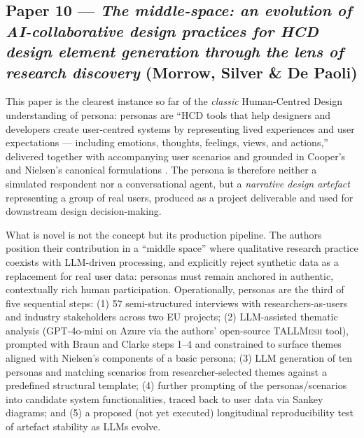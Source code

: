 
\subsection*{Paper 10 --- \emph{The middle-space: an evolution of AI-collaborative design practices for HCD design element generation through the lens of research discovery} (Morrow, Silver \& De Paoli)}

This paper is the clearest instance so far of the \emph{classic} Human-Centred Design understanding of persona: personas are ``HCD tools that help designers and developers create user-centred systems by representing lived experiences and user expectations --- including emotions, thoughts, feelings, views, and actions,'' delivered together with accompanying user scenarios and grounded in Cooper's and Nielsen's canonical formulations \cite{cooper1999, nielsen1990}. The persona is therefore neither a simulated respondent nor a conversational agent, but a \emph{narrative design artefact} representing a group of real users, produced as a project deliverable and used for downstream design decision-making.

What is novel is not the concept but its production pipeline. The authors position their contribution in a ``middle space'' where qualitative research practice coexists with LLM-driven processing, and explicitly reject synthetic data as a replacement for real user data: personas must remain anchored in authentic, contextually rich human participation. Operationally, personas are the third of five sequential steps: (1) 57 semi-structured interviews with researchers-as-users and industry stakeholders across two EU projects; (2) LLM-assisted thematic analysis (GPT-4o-mini on Azure via the authors' open-source \textsc{TALLMesh} tool), prompted with Braun and Clarke steps 1--4 and constrained to surface themes aligned with Nielsen's components of a basic persona; (3) LLM generation of ten personas and matching scenarios from researcher-selected themes against a predefined structural template; (4) further prompting of the personas/scenarios into candidate system functionalities, traced back to user data via Sankey diagrams; and (5) a proposed (not yet executed) longitudinal reproducibility test of artefact stability as LLMs evolve.

